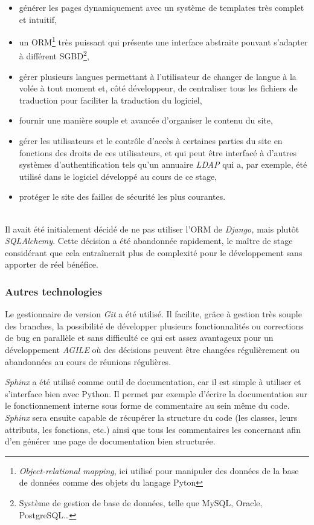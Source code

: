 \documentclass[12pt,a4paper,twoside]{report}
\begin{document}
\begin{itemize}
	\item générer les pages dynamiquement avec un système de templates très
	complet et intuitif,
	\item un ORM\footnote{\emph{Object-relational mapping}, ici utilisé pour
	manipuler des données de la base de données comme des objets du langage
	Pyton} très puissant qui présente une interface abstraite pouvant
	s’adapter à différent SGBD\footnote{Système de gestion de base de données,
	telle que MySQL, Oracle, PostgreSQL\dots},
	\item gérer plusieurs langues permettant à l’utilisateur de changer de
	langue à la volée à tout moment et, côté développeur, de centraliser tous
	les fichiers de traduction pour faciliter la traduction du logiciel,
	\item fournir une manière souple et avancée d’organiser le contenu du site,
	\item gérer les utilisateurs et le contrôle d’accès à certaines parties du
	site en fonctions des droits de ces utilisateurs, et qui peut être
	interfacé à d’autres systèmes d’authentification tels qu’un annuaire
	\emph{LDAP} qui a, par exemple, été utilisé dans le logiciel développé au
	cours de ce stage,
	\item protéger le site des failles de sécurité les plus courantes.
\end{itemize}
~\\

Il avait été initialement décidé de ne pas utiliser l’ORM de \emph{Django,}
mais plutôt \emph{SQLAlchemy}. Cette décision a été abandonnée rapidement, le
maître de stage considérant que cela entraînerait plus de complexité pour le
développement sans apporter de réel bénéfice.

\subsubsection{Autres technologies}

Le gestionnaire de version \emph{Git} a été utilisé. Il facilite, grâce à
gestion très souple des branches, la possibilité de développer plusieurs
fonctionnalités ou corrections de bug en parallèle et sans difficulté ce qui
est assez avantageux pour un développement \emph{AGILE} où des décisions
peuvent être changées régulièrement ou abandonnées au cours de réunions
régulières.

\emph{Sphinx} a été utilisé comme outil de documentation, car il est simple à
utiliser et s’interface bien avec Python. Il permet par exemple d’écrire la
documentation sur le fonctionnement interne sous forme de commentaire au sein
même du code. \emph{Sphinx} sera ensuite capable de récupérer la structure du
code (les classes, leurs attributs, les fonctions, etc.) ainsi que tous les
commentaires les concernant afin d’en générer une page de documentation bien
structurée.
\end{document}

